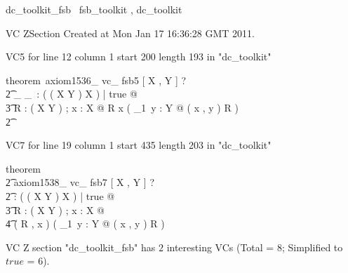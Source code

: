 \documentclass{article}
\begin{document}

\begin{zsection}
	 \SECTION dc\_toolkit\_fsb \parents~fsb\_toolkit , dc\_toolkit
\end{zsection}

VC ZSection Created at Mon Jan 17 16:36:28 GMT 2011.

VC5 for line 12 column 1 start 200 length 193 in "dc_toolkit"
\begin{zed}
theorem~axiom1536\_ vc\_ fsb5 [ X , Y ] \vdash ? \\
   \t2 \exists \_ \appliesTo \_~: \power ( \power ( X \cross Y ) \cross X ) | true @ \\
    \t3 \forall R : \power ( X \cross Y ) ; x : X @ R \appliesTo x \iff ( {\exists}_{1}~y : Y @ ( x , y ) \in R ) \\
   \t2
\end{zed}

VC7 for line 19 column 1 start 435 length 203 in "dc_toolkit"
\begin{zed}
theorem \\
   \t2 axiom1538\_ vc\_ fsb7 [ X , Y ] \vdash ? \\
   \t2 \exists \appliesToNofix : \power ( \power ( X \cross Y ) \cross X ) | true @ \\
    \t3 \forall R : \power ( X \cross Y ) ; x : X @ \\
     \t4 ( R , x ) \in \appliesToNofix \iff ( {\exists}_{1}~y : Y @ ( x , y ) \in R )
\end{zed}



 VC Z section "dc_toolkit_fsb" has $2$ interesting VCs (Total = 8; Simplified to $true$ = 6).



\end{document}
